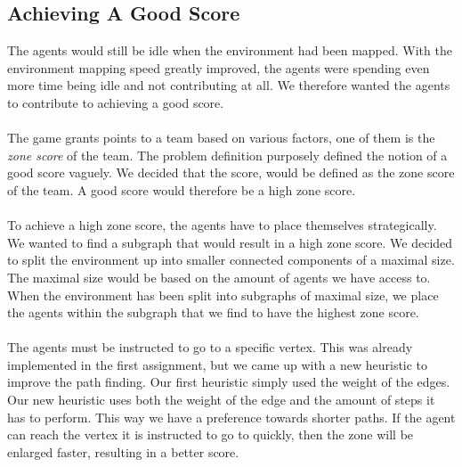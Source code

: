 \documentclass[11pt]{report}
\begin{document}
\subsection*{Achieving A Good Score}
The agents would still be idle when the environment had been mapped. With the environment mapping speed greatly improved, the agents were spending even more time being idle and not contributing at all. We therefore wanted the agents to contribute to achieving a good score.\\
\\
The game grants points to a team based on various factors, one of them is the \emph{zone score} of the team. The problem definition purposely defined the notion of a good score vaguely. We decided that the score, would be defined as the zone score of the team. A good score would therefore be a high zone score.\\
\\
To achieve a high zone score, the agents have to place themselves strategically. We wanted to find a subgraph that would result in a high zone score. We decided to split the environment up into smaller connected components of a maximal size. The maximal size would be based on the amount of agents we have access to. When the environment has been split into subgraphs of maximal size, we place the agents within the subgraph that we find to have the highest zone score.\\
\\
The agents must be instructed to go to a specific vertex. This was already implemented in the first assignment, but we came up with a new heuristic to improve the path finding. Our first heuristic simply used the weight of the edges. Our new heuristic uses both the weight of the edge and the amount of steps it has to perform. This way we have a preference towards shorter paths. If the agent can reach the vertex it is instructed to go to quickly, then the zone will be enlarged faster, resulting in a better score.
\end{document}
